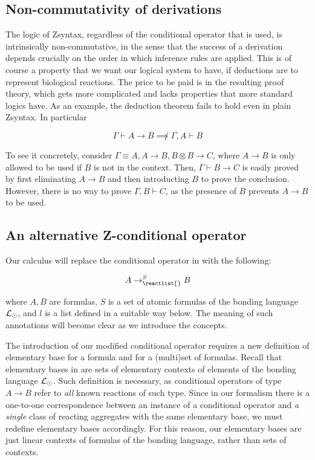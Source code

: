 \subsection{Non-commutativity of derivations}

The logic of Zsyntax, regardless of the conditional operator that is used, is
intrinsically non-commutative, in the sense that the success of a derivation
depends crucially on the order in which inference rules are applied. This is of
course a property that we want our logical system to have, if deductions are to
represent biological reactions. The price to be paid is in the resulting proof
theory, which gets more complicated and lacks properties that more standard
logics have. As an example, the deduction theorem fails to hold even in plain
Zsyntax. In particular

\[
  \Gamma \vdash A \rightarrow B \not\implies \Gamma, A \vdash B
\]

To see it concretely, consider $\Gamma \equiv A, A \rightarrow B, B \otimes B
\rightarrow C$, where $A \rightarrow B$ is only allowed to be used if $B$ is not
in the context. Then, $\Gamma \vdash B \rightarrow C$ is easily proved by first
eliminating $A \rightarrow B$ and then introducting $B$ to prove the conclusion.
However, there is no way to prove $\Gamma, B \vdash C$, as the presence of $B$
prevents $A \rightarrow B$ to be used.

\subsection{An alternative Z-conditional operator}

Our calculus \eznd{} will replace the conditional operator in \znd{} with the
following:

\[
  A \rightarrow_{\reactlist{}}^S B
\]

where $A,B$ are formulas, $S$ is a set of atomic formulas of the bonding
language $\mathcal{L}_{\odot}$, and $l$ is a list defined in a suitable way below. The
meaning of such annotations will become clear as we introduce the concepts.

The introduction of our modified conditional operator requires a new definition
of elementary base for a formula and for a (multi)set of formulas. Recall that
elementary bases in \cite{adding-logic} are sets of elementary contexts of
elements of the bonding language $\mathcal{L}_{\odot}$. Such definition is necessary,
as conditional operators of type $A \rightarrow B$ refer to \emph{all} known
reactions of such type. Since in our formalism there is a one-to-one
correspondence between an instance of a conditional operator and \emph{a single}
class of reacting aggregates with the same elementary base, we must redefine
elementary bases accordingly. For this reason, our elementary bases are just
linear contexts of formulas of the bonding language, rather than sets of
contexts.

